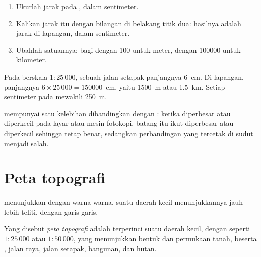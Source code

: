 \begin{method}
\begin{enumerate}
  \item Ukurlah jarak pada , dalam sentimeter.
  \item Kalikan jarak itu dengan bilangan di belakang titik dua: hasilnya
        adalah jarak di lapangan, dalam sentimeter.
  \item Ubahlah satuannya: bagi dengan 100 untuk meter, dengan
        \num{100000} untuk kilometer.
\end{enumerate}
\end{method}

\begin{example}
Pada  berskala $1 : 25\,000$, sebuah jalan setapak panjangnya
\qty{6}{cm}. Di lapangan, panjangnya $6 \times 25\,000 = \num{150000}$~cm,
yaitu \qty{1500}{m} atau \qty{1.5}{km}. Setiap sentimeter pada 
mewakili \qty{250}{m}.
\end{example}

 mempunyai satu kelebihan dibandingkan dengan :
ketika  diperbesar atau diperkecil pada layar atau mesin fotokopi,
batang itu ikut diperbesar atau diperkecil sehingga tetap benar,
sedangkan perbandingan yang tercetak di sudut  menjadi salah.

\section{Peta topografi}

 menunjukkan  dengan warna-warna.  suatu daerah kecil
menunjukkannya jauh lebih teliti, dengan garis-garis.

\begin{definition}\label{def:g9:maps-of-the-earth:topographic-map}
Yang disebut \emph{peta topografi} adalah 
terperinci suatu daerah kecil, dengan  seperti $1 : 25\,000$ atau
$1 : 50\,000$, yang menunjukkan bentuk dan  permukaan tanah,
beserta , jalan raya, jalan setapak, bangunan, dan hutan.
\end{definition}

